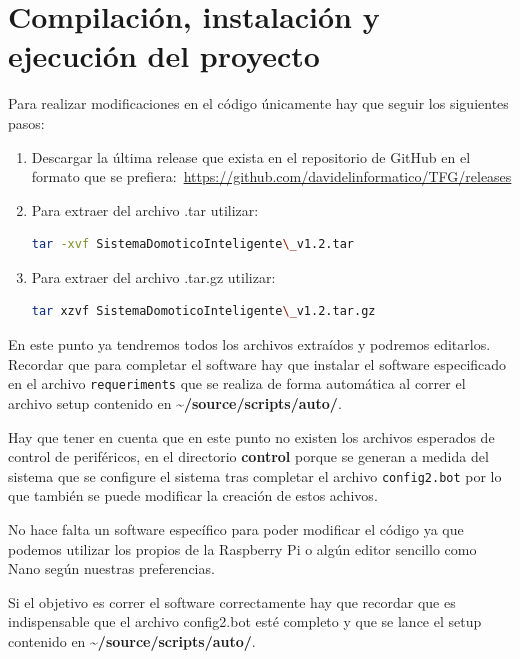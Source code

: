 \section{Compilación, instalación y ejecución del proyecto}
Para realizar modificaciones en el código únicamente hay que seguir los siguientes pasos:
\begin{enumerate}
    \item Descargar la última release que exista en el repositorio de GitHub en el formato que se prefiera:~\url{https://github.com/davidelinformatico/TFG/releases}
    \item Para extraer del archivo .tar utilizar: 
    \begin{lstlisting}[language=sh, firstnumber=0, basicstyle=\normalsize, caption={Comando para extraer archivos .tar.}] 
tar -xvf SistemaDomoticoInteligente\_v1.2.tar \end{lstlisting}
        
    \item Para extraer del archivo .tar.gz utilizar:
    \begin{lstlisting}[language=sh, firstnumber=0, basicstyle=\normalsize, caption={Comando para extraer archivos .tar.gz}] 
tar xzvf SistemaDomoticoInteligente\_v1.2.tar.gz \end{lstlisting}
\end{enumerate}
En este punto ya tendremos todos los archivos extraídos y podremos editarlos. Recordar que para completar el software hay que instalar el software especificado en el archivo \texttt{requeriments} que se realiza de forma automática al correr el archivo setup contenido en \textbf{\textasciitilde/source/scripts/auto/}. 

Hay que tener en cuenta que en este punto no existen los archivos esperados de control de periféricos, en el directorio \textbf{control} porque se generan a medida del sistema que se configure el sistema tras completar el archivo \texttt{config2.bot} por lo que también se puede modificar la creación de estos achivos.

No hace falta un software específico para poder modificar el código ya que podemos utilizar los propios de la Raspberry Pi o algún editor sencillo como Nano según nuestras preferencias.

Si el objetivo es correr el software correctamente hay que recordar que es indispensable que el archivo config2.bot esté completo y que se lance el setup contenido en \textbf{\textasciitilde/source/scripts/auto/}.

